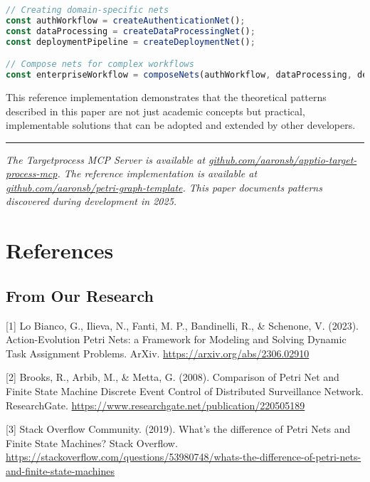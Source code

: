 \documentclass[11pt,a4paper]{article}
\begin{document}
\begin{lstlisting}[language=TypeScript]
// Creating domain-specific nets
const authWorkflow = createAuthenticationNet();
const dataProcessing = createDataProcessingNet();
const deploymentPipeline = createDeploymentNet();

// Compose nets for complex workflows
const enterpriseWorkflow = composeNets(authWorkflow, dataProcessing, deploymentPipeline);
\end{lstlisting}

This reference implementation demonstrates that the theoretical patterns described in this paper are not just academic concepts but practical, implementable solutions that can be adopted and extended by other developers.

\begin{center}
\rule{0.5\textwidth}{0.4pt}
\end{center}

\textit{The Targetprocess MCP Server is available at \href{https://github.com/aaronsb/apptio-target-process-mcp}{github.com/aaronsb/apptio-target-process-mcp}. The reference implementation is available at \href{https://github.com/aaronsb/petri-graph-template}{github.com/aaronsb/petri-graph-template}. This paper documents patterns discovered during development in 2025.}

\section*{References}

\subsection*{From Our Research}

[1] Lo Bianco, G., Ilieva, N., Fanti, M. P., Bandinelli, R., \& Schenone, V. (2023). Action-Evolution Petri Nets: a Framework for Modeling and Solving Dynamic Task Assignment Problems. ArXiv. \url{https://arxiv.org/abs/2306.02910}

[2] Brooks, R., Arbib, M., \& Metta, G. (2008). Comparison of Petri Net and Finite State Machine Discrete Event Control of Distributed Surveillance Network. ResearchGate. \url{https://www.researchgate.net/publication/220505189}

[3] Stack Overflow Community. (2019). What's the difference of Petri Nets and Finite State Machines? Stack Overflow. \url{https://stackoverflow.com/questions/53980748/whats-the-difference-of-petri-nets-and-finite-state-machines}
\end{document}
